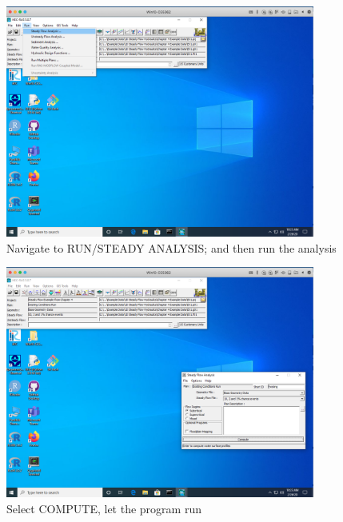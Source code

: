 \begin{figure}[h!] %
   \centering
   \includegraphics[width=4in]{run-steady-analysis.png} 
   \caption{Navigate to RUN/STEADY ANALYSIS; and then run the analysis }
   \label{fig:run-steady-analysis}
\end{figure}



\begin{figure}[h!] %
   \centering
   \includegraphics[width=4in]{select-plan-compute.png} 
   \caption{Select COMPUTE, let the program run}
   \label{fig:select-plan-compute}
\end{figure}

\clearpage

